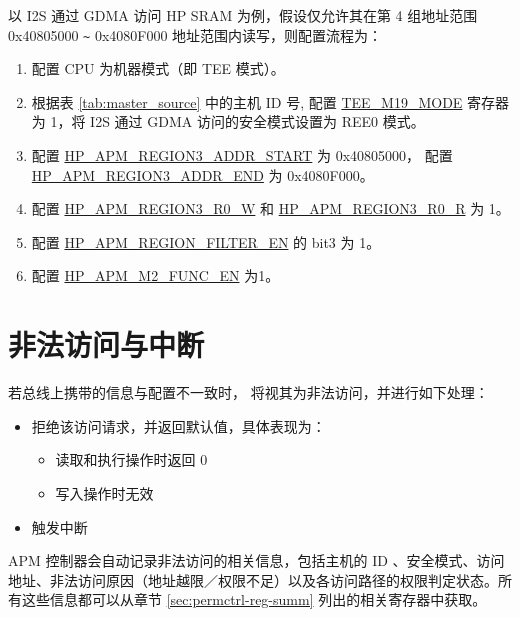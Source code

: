 \documentclass[main\_\_CN.tex]{subfiles}
\begin{document}
以 I2S 通过 GDMA 访问 HP SRAM 为例，假设仅允许其在第 4 组地址范围 0x40805000 \verb+~+ 0x4080F000 地址范围内读写，则配置流程为：

\begin{enumerate}
    \item 配置 CPU 为机器模式（即 TEE 模式）。

    \item 根据表 \ref{tab:master_source} 中的主机 ID 号, 配置 \hyperref[fielddesc:TEEM0MODE]{TEE\_M19\_MODE} 寄存器为 1，将 I2S 通过 GDMA 访问的安全模式设置为 REE0 模式。

    \item 配置 \hyperref[regdesc:HPAPMREGION0ADDRSTARTREG]{HP\_APM\_REGION3\_ADDR\_START} 为 0x40805000， 配置 \hyperref[regdesc:HPAPMREGION0ADDRSTARTREG]{HP\_APM\_REGION3\_ADDR\_END} 为 0x4080F000。
    \item 配置 \hyperref[fielddesc:HPAPMREGION0R0W]{HP\_APM\_REGION3\_R0\_W} 和 \hyperref[fielddesc:HPAPMREGION0R0R]{HP\_APM\_REGION3\_R0\_R} 为 1。

    \item 配置 \hyperref[fielddesc:HPAPMREGIONFILTEREN]{HP\_APM\_REGION\_FILTER\_EN} 的 bit3 为 1。

    \item 配置 \hyperref[fielddesc:HPAPMM2FUNCEN]{HP\_APM\_M2\_FUNC\_EN} 为1。

\end{enumerate}



\section{非法访问与中断}


若总线上携带的信息与配置不一致时，\chipname{} 将视其为非法访问，并进行如下处理：


\begin{itemize}
    \item 拒绝该访问请求，并返回默认值，具体表现为：
    \begin{itemize}
        \item 读取和执行操作时返回 0
        \item 写入操作时无效
    \end{itemize}
    \item 触发中断
\end{itemize}


APM 控制器会自动记录非法访问的相关信息，包括主机的 ID 、安全模式、访问地址、非法访问原因（地址越限／权限不足）以及各访问路径的权限判定状态。所有这些信息都可以从章节 \ref{sec:permctrl-reg-summ}  列出的相关寄存器中获取。
\end{document}
